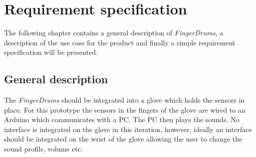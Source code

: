 \chapter{Requirement specification}
\label{kravsspec}
The following chapter contains a general description of \textit{FingerDrums}, a description of the use case for the product and finally a simple requirement specification will be presented.


\section{General description}
%

The \textit{FingerDrums} should be integrated into a glove which holds the sensors in place. For this prototype the sensors in the fingers of the glove are wired to an Arduino which communicates with a PC. The PC then plays the sounds. No interface is integrated on the glove in this iteration, however, ideally an interface should be integrated on the wrist of the glove allowing the user to change the sound profile, volume etc.

